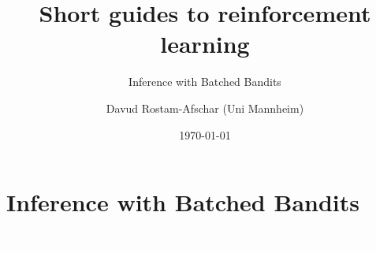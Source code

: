 \documentclass[11pt,table]{beamer}
\title[]{Short guides to reinforcement learning}
\subtitle[]{Inference with Batched Bandits}
\author[D. Rostam-Afschar]{\textcolor{gray1}{Davud Rostam-Afschar (Uni Mannheim)}}
\date[]{\today}
\begin{document}
\begin{frame}[plain]
  \titlepage
\end{frame}


\section{Inference with Batched Bandits}
{
\begin{frame}
\centering
\Huge
\textcolor{white}{How to get bandits normal?}
\thispagestyle{empty}
\end{frame}
}
\end{document}
